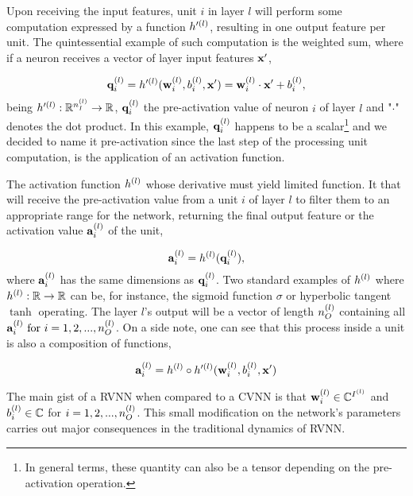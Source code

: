 Upon receiving the input features, unit $ i $ in layer $ l $ will perform some computation expressed by a function $ h'^{(l)} $, resulting in one output feature per unit. The quintessential example of such computation is the weighted sum, where if a neuron receives a vector of layer input features $ \mathbf{x}' $,

\begin{equation}
	\mathbf{q}^{(l)}_{i} = h'^{(l)}(\mathbf{w}^{(l)}_{i}, b^{(l)}_{i}, \mathbf{x}') = \mathbf{w}^{(l)}_{i} \cdot \mathbf{x}' + b^{(l)}_{i},
	\label{eq:pact_weighted_sum}
\end{equation}
being $ h'^{(l)}:  \mathbb{R}^{n^{(l)}_{I}} \rightarrow \mathbb{R} $, $ \mathbf{q}^{(l)}_{i} $ the pre-activation value of neuron $ i $ of layer $ l $ and "$ \cdot $" denotes the dot product. In this example, $ \mathbf{q}^{(l)}_{i} $ happens to be a scalar\footnote{In general terms, these quantity can also be a tensor depending on the pre-activation operation.} and we decided to name it pre-activation since the last step of the processing unit computation, is the application of an activation function.

The activation function $ h^{(l)} $ whose derivative must yield limited function. It that will receive the pre-activation value from a unit $ i $ of layer $ l $ to filter them to an appropriate range for the network, returning the final output feature or the activation value $ \mathbf{a}^{(l)}_{i} $ of the unit,

\begin{equation}
	\mathbf{a}^{(l)}_{i} = h^{(l)}(\mathbf{q}^{(l)}_{i}),
	\label{eq:act}
\end{equation}
where $ \mathbf{a}^{(l)}_{i} $ has the same dimensions as $ \mathbf{q}^{(l)}_{i} $. Two standard examples of $ h^{(l)} $ where $ h^{(l)}: \mathbb{R} \rightarrow \mathbb{R} $ can be, for instance, the sigmoid function $ \sigma $ or hyperbolic tangent $ \tanh $ operating. The layer $ l $'s output will be a vector of length $ n^{(l)}_{O} $ containing all $ \mathbf{a}^{(l)}_{i} \ \text{for} \ i = 1, 2, ..., n^{(l)}_{O} $. On a side note, one can see that this process inside a unit is also a composition of functions,

\begin{equation}
	\mathbf{a}^{(l)}_{i} = h^{(l)} \circ h'^{(l)}(\mathbf{w}^{(l)}_{i}, b^{(l)}_{i}, \mathbf{x}')
	\label{eq:comp_act}
\end{equation}

The main gist of a \gls{RVNN} when compared to a \gls{CVNN} is that $ \mathbf{w}^{(l)}_{i} \in \mathbb{C}^{I^{(l)}} $ and $ b^{(l)}_{i} \in \mathbb{C} $ for $ i = 1, 2, ..., n^{(l)}_{O} $. This small modification on the network's parameters carries out major consequences in the traditional dynamics of \gls{RVNN}.

